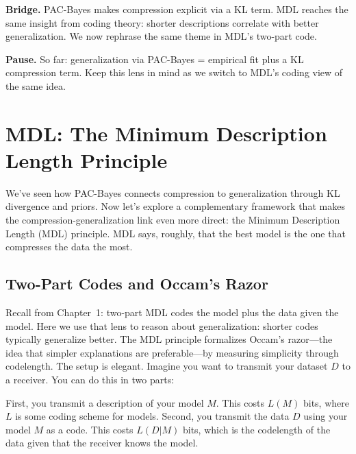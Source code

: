 \vspace{2em}


\vspace{0.8em}
\textbf{Bridge.} PAC-Bayes makes compression explicit via a KL term. MDL reaches the same insight from coding theory: shorter descriptions correlate with better generalization. We now rephrase the same theme in MDL's two-part code.
\vspace{0.8em}

\vspace{1em}
\textbf{Pause.} So far: generalization via PAC\mbox{-}Bayes = empirical fit plus a KL compression term. Keep this lens in mind as we switch to MDL's coding view of the same idea.
\vspace{1em}
\section{MDL: The Minimum Description Length Principle}

We've seen how PAC-Bayes connects compression to generalization through KL divergence and priors. Now let's explore a complementary framework that makes the compression-generalization link even more direct: the Minimum Description Length (MDL) principle. MDL says, roughly, that the best model is the one that compresses the data the most.

\vspace{1em}

\subsection{Two-Part Codes and Occam's Razor}


\vspace{0.3cm}
Recall from Chapter~1: two-part MDL codes the model plus the data given the model. Here we use that lens to reason about generalization: shorter codes typically generalize better.
The MDL principle formalizes Occam's razor---the idea that simpler explanations are preferable---by measuring simplicity through codelength. The setup is elegant. Imagine you want to transmit your dataset $D$ to a receiver. You can do this in two parts:

\vspace{0.3cm}

First, you transmit a description of your model $M$. This costs $L(M)$ bits, where $L$ is some coding scheme for models. Second, you transmit the data $D$ using your model $M$ as a code. This costs $L(D|M)$ bits, which is the codelength of the data given that the receiver knows the model.

